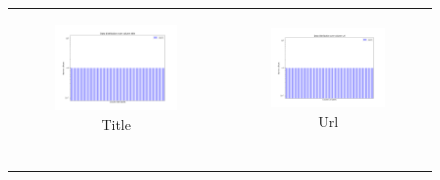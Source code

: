 \begin{figure}
{\begin{tabular}[c]{cc}
\begin{subfigure}[c]{0.45\textwidth}
         \includegraphics[width=\textwidth]{assets/results/dbpediaProfiles/distribution/title.png}
         \caption{Title}
         \label{}
     \end{subfigure} &
     \begin{subfigure}[c]{0.45\textwidth}
         \centering
         \includegraphics[width=\textwidth]{assets/results/dbpediaProfiles/distribution/url.png}
         \caption{Url}
         \label{}
     \end{subfigure} \\
     \multicolumn{2}{c}{\begin{subfigure}[c]{0.45\textwidth}
         \centering

\end{subfigure}}
\end{tabular}}
\end{figure}
